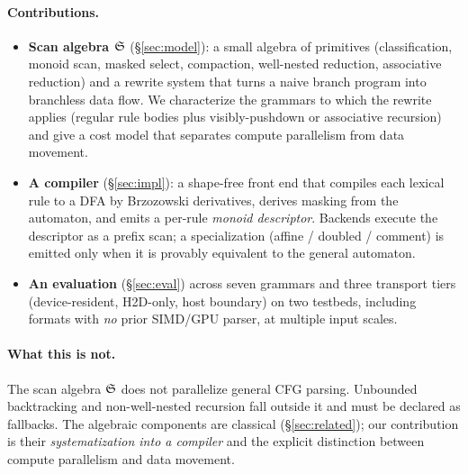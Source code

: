 \paragraph{Contributions.}
\begin{itemize}
  \item \textbf{Scan algebra $\mathfrak{S}$} (\S\ref{sec:model}): a small algebra of primitives
        (classification, monoid scan, masked select, compaction, well-nested
        reduction, associative reduction) and a rewrite system that turns a
        naive branch program into branchless data flow.  We characterize the
        grammars to which the rewrite applies (regular rule bodies plus
        visibly-pushdown or associative recursion) and give a cost model that
        separates compute parallelism from data movement.
  \item \textbf{A compiler} (\S\ref{sec:impl}): a shape-free front end that
        compiles each lexical rule to a DFA by Brzozowski derivatives, derives
        masking from the automaton, and emits a per-rule \emph{monoid
        descriptor}.  Backends execute the descriptor as a prefix scan; a
        specialization (affine / doubled / comment) is emitted only when it is
        provably equivalent to the general automaton.
  \item \textbf{An evaluation} (\S\ref{sec:eval}) across seven grammars and
        three transport tiers (device-resident, H2D-only, host boundary) on two
        testbeds, including formats with \emph{no} prior SIMD/GPU parser, at
        multiple input scales.
\end{itemize}

\paragraph{What this is not.}  The scan algebra $\mathfrak{S}$ does not parallelize general CFG
parsing.  Unbounded backtracking and non-well-nested recursion fall outside it
and must be declared as fallbacks.  The algebraic components are classical
(\S\ref{sec:related}); our contribution is their \emph{systematization into a
compiler} and the explicit distinction between compute parallelism and data
movement.
